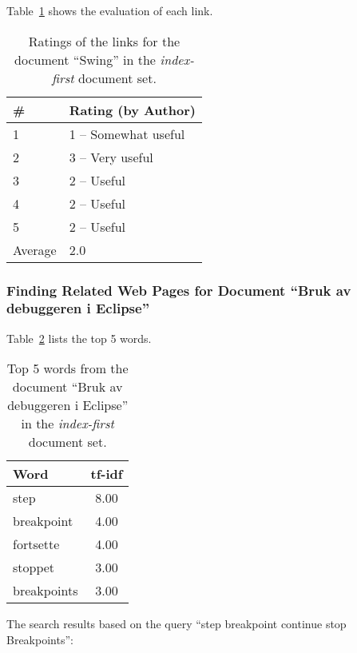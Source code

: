 Table~\ref{tab:ratings-no-swing} shows the evaluation of each link.
\begin{table}[H]
\centering
\begin{tabular}{|l|l|}
\hline\hline
    \# & Rating (by Author) \\
\hline
    1 & 1 -- Somewhat useful \\
    2 & 3 -- Very useful \\
    3 & 2 -- Useful \\
    4 & 2 -- Useful \\
    5 & 2 -- Useful \\
\hline
    Average & 2.0 \\
\hline\hline
\end{tabular}
\caption{Ratings of the links for the document ``Swing'' in the \textit{index-first} document set.}
\label{tab:ratings-no-swing}
\end{table}



\subsubsection{Finding Related Web Pages for Document ``Bruk av debuggeren i Eclipse''}
\label{subsubsec:no-bruk-av-debuggeren-i-eclipse}

Table~\ref{tab:topWords-no-bruk-av-debuggeren-i-eclipse} lists the top 5 words.
\begin{table}[H]
\centering
\begin{tabular}{|l|c|}
\hline\hline
    Word & tf-idf \\
\hline
    step & 8.00 \\
    breakpoint & 4.00 \\
    fortsette & 4.00 \\
    stoppet & 3.00 \\
    breakpoints & 3.00 \\
\hline\hline
\end{tabular}
\caption{Top 5 words from the document ``Bruk av debuggeren i Eclipse'' in the \textit{index-first} document set.}
\label{tab:topWords-no-bruk-av-debuggeren-i-eclipse}
\end{table}

The search results based on the query ``step breakpoint continue stop Breakpoints'':

